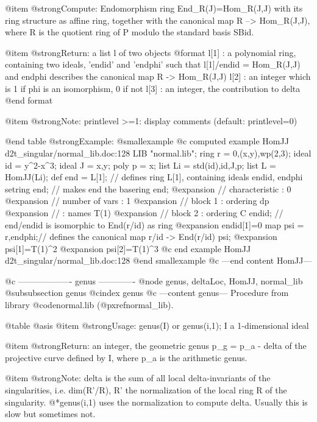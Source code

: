 @item @strong{Compute:}
Endomorphism ring End_R(J)=Hom_R(J,J) with its ring structure as
affine ring, together with the canonical map R --> Hom_R(J,J),
where R is the quotient ring of P modulo the standard basis SBid.

@item @strong{Return:}
a list l of two objects
@format
         l[1] : a polynomial ring, containing two ideals, 'endid' and 'endphi'
               such that l[1]/endid = Hom_R(J,J) and
               endphi describes the canonical map R -> Hom_R(J,J)
         l[2] : an integer which is 1 if phi is an isomorphism, 0 if not
         l[3] : an integer, the contribution to delta
@end format

@item @strong{Note:}
printlevel >=1: display comments (default: printlevel=0)

@end table
@strong{Example:}
@smallexample
@c computed example HomJJ d2t_singular/normal_lib.doc:128 
LIB "normal.lib";
ring r   = 0,(x,y),wp(2,3);
ideal id = y^2-x^3;
ideal J  = x,y;
poly p   = x;
list Li = std(id),id,J,p;
list L   = HomJJ(Li);
def end = L[1];    // defines ring L[1], containing ideals endid, endphi
setring end;       // makes end the basering
end;
@expansion{} //   characteristic : 0
@expansion{} //   number of vars : 1
@expansion{} //        block   1 : ordering dp
@expansion{} //                  : names    T(1) 
@expansion{} //        block   2 : ordering C
endid;             // end/endid is isomorphic to End(r/id) as ring
@expansion{} endid[1]=0
map psi = r,endphi;// defines the canonical map r/id -> End(r/id)
psi;
@expansion{} psi[1]=T(1)^2
@expansion{} psi[2]=T(1)^3
@c end example HomJJ d2t_singular/normal_lib.doc:128
@end smallexample
@c ---end content HomJJ---

@c ------------------- genus -------------
@node genus, deltaLoc, HomJJ, normal_lib
@subsubsection genus
@cindex genus
@c ---content genus---
Procedure from library @code{normal.lib} (@pxref{normal_lib}).

@table @asis
@item @strong{Usage:}
genus(I) or genus(i,1); I a 1-dimensional ideal

@item @strong{Return:}
an integer, the geometric genus p_g = p_a - delta of the projective
curve defined by I, where p_a is the arithmetic genus.

@item @strong{Note:}
delta is the sum of all local delta-invariants of the singularities,
i.e. dim(R'/R), R' the normalization of the local ring R of the
singularity.
@*genus(i,1) uses the normalization to compute delta. Usually this
is slow but sometimes not.


